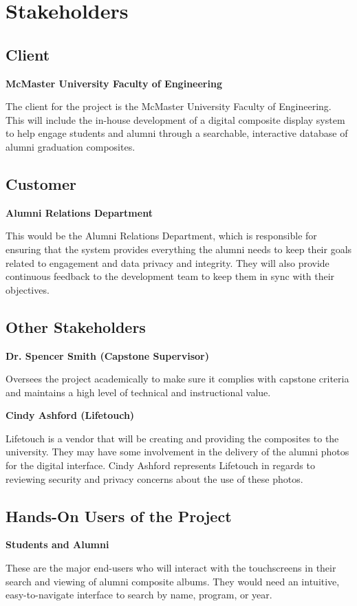 \documentclass[12pt]{article}
\begin{document}
\section{Stakeholders}

\subsection{Client}
\textbf{McMaster University Faculty of Engineering} \par
The client for the project is the McMaster University Faculty of Engineering. This will include the in-house development of a digital composite display system to help engage students and alumni through a searchable, interactive database of alumni graduation composites.

\subsection{Customer}
\textbf{Alumni Relations Department} \par
This would be the Alumni Relations Department, which is responsible for ensuring that the system provides everything the alumni needs to keep their goals related to engagement and data privacy and integrity. They will also provide continuous feedback to the development team to keep them in sync with their objectives.

\subsection{Other Stakeholders}
\textbf{Dr. Spencer Smith (Capstone Supervisor)} \par
Oversees the project academically to make sure it complies with capstone criteria and maintains a high level of technical and instructional value.

\textbf{Cindy Ashford (Lifetouch)} \par
Lifetouch is a vendor that will be creating and providing the composites to the university. They may have some involvement in the delivery of the alumni photos for the digital interface. Cindy Ashford represents Lifetouch in regards to reviewing security and privacy concerns about the use of these photos.

\subsection{Hands-On Users of the Project}
\textbf{Students and Alumni} \par
These are the major end-users who will interact with the touchscreens in their search and viewing of alumni composite albums. They would need an intuitive, easy-to-navigate interface to search by name, program, or year.
\end{document}

